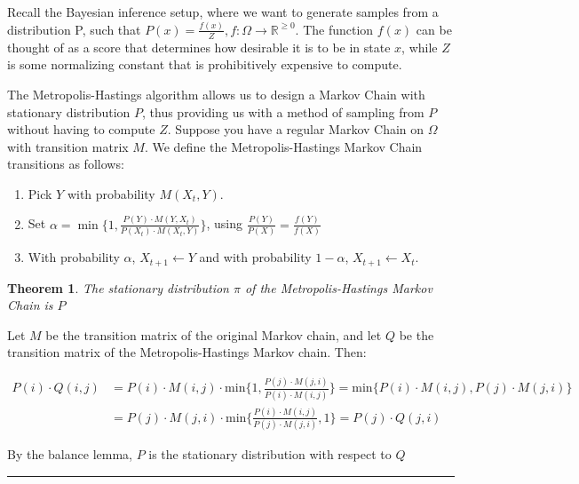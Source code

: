 \documentclass[twoside]{article}
\newcounter{lecnum}
\def\beginrefs{\begin{list}%
        {[\arabic{equation}]}{\usecounter{equation}
         \setlength{\leftmargin}{2.0truecm}\setlength{\labelsep}{0.4truecm}%
         \setlength{\labelwidth}{1.6truecm}}}
\def\endrefs{\end{list}}
\def\bibentry#1{\item[\hbox{[#1]}]}
\newtheorem{theorem}{Theorem}[lecnum]
\newenvironment{proof}{{\bf Proof:}}{\hfill\rule{2mm}{2mm}}
\begin{document}
Recall the Bayesian inference setup, where we want to generate samples from a distribution P, such that $P(x) = \frac{f(x)}{Z}, f: \Omega \rightarrow \mathbb{R}^{\geq 0}$. The function $f(x)$ can be thought of as a score that determines how desirable it is to be in state $x$, while $Z$ is some normalizing constant that is prohibitively expensive to compute. 

The Metropolis-Hastings algorithm allows us to design a Markov Chain with stationary distribution $P$, thus providing us with a method of sampling from $P$ without having to compute $Z$. Suppose you have a regular Markov Chain on $\Omega$ with transition matrix $M$. We define the Metropolis-Hastings Markov Chain transitions as follows:

\begin{enumerate}
   \item Pick $Y$ with probability $M(X_t, Y)$.
   \item Set $\alpha = \min\{ 1, \frac{P(Y) \cdot M(Y, X_t)}{P(X_t) \cdot M(X_t, Y)} \}$, using $\frac{P(Y)}{P(X)} = \frac{f(Y)}{f(X)}$
   \item With probability $\alpha$, $X_{t+1} \leftarrow Y$ and with probability $1 - \alpha$, $X_{t+1} \leftarrow X_t$.
\end{enumerate}

\begin{theorem}
  The stationary distribution $\pi$ of the Metropolis-Hastings Markov Chain is $P$
\end{theorem}

\begin{proof}
Let $M$ be the transition matrix of the original Markov chain, and let $Q$ be the transition matrix of the Metropolis-Hastings Markov chain. Then:

\begin{equation*}
\begin{split}
P(i) \cdot Q(i,j)  & = P(i) \cdot M(i,j) \cdot \mbox{min}\{1, \frac{P(j) \cdot M(j,i)}{P(i) \cdot M(i,j)}\} = \mbox{min}\{P(i) \cdot M(i,j), P(j) \cdot M(j,i) \} \\
& = P(j) \cdot M(j,i) \cdot \mbox{min}\{\frac{P(i) \cdot M(i,j)}{P(j) \cdot M(j,i)}, 1 \} = P(j) \cdot Q(j, i)
\end{split}
\end{equation*}

By the balance lemma, $P$ is the stationary distribution with respect to $Q$
\end{proof}


\end{document}
